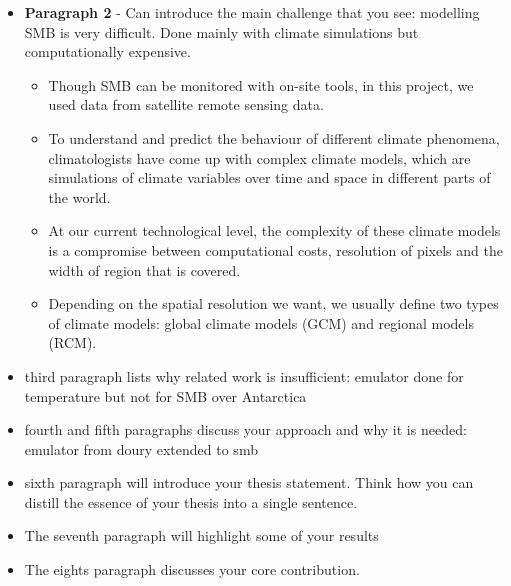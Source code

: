 \documentclass[a4paper,11pt,oneside]{report}
\begin{document}
\begin{itemize}
\begin{itemize}
        If Antarctica's ice sheet were to melt suddenly, sea levels would rise to approximately $60$\si{m}~\cite{Kittel, Fretwell, Morlighem}, making the AIS the most significant potential contributor to sea-level rise. Unfortunately, the AIS has been steadily losing mass since 2002~\cite{Shepherd, Mottram}, mainly because of calving\footnote{Calving is the process of chunks of ice breaking off from the edge of a glacier~\cite{Marshak}} and melting at the water-ice interface underneath ice shelves (submarine melting)~\cite{Kittel, Mottram, Rignot}. Because the SMB is a good indicator of stability and evolution of ice shelves, it is therefore imperative to have a precise estimation of the SMB of the AIS~\cite{icesheet}.
    \end{itemize}
    \item \textbf{Paragraph 2} - Can introduce the main challenge that you see: modelling SMB is very difficult. Done mainly with climate simulations but computationally expensive. 
    \begin{itemize}
        \item Though SMB can be monitored with on-site tools, in this project, we used data from satellite remote sensing data. 
        \item To understand and predict the behaviour of different climate phenomena, climatologists have come up with complex climate models, which are simulations of climate variables over time and space in different parts of the world. 
        \item At our current technological level, the complexity of these climate models is a compromise between computational costs, resolution of pixels and the width of region that is covered. 
        \item Depending on the spatial resolution we want, we usually define two types of climate models: global climate models (GCM) and regional models (RCM). 
    \end{itemize}
    \item third paragraph lists why related work is insufficient: emulator done for temperature but not for SMB over Antarctica
    \item fourth and fifth paragraphs discuss your approach and why it is needed: emulator from doury extended to smb
    \item sixth paragraph will introduce your thesis statement. Think how you can distill the essence of your thesis into a single sentence.
    \item The seventh paragraph will highlight some of your results
    \item The eights paragraph discusses your core contribution.

\end{itemize}
\end{document}
